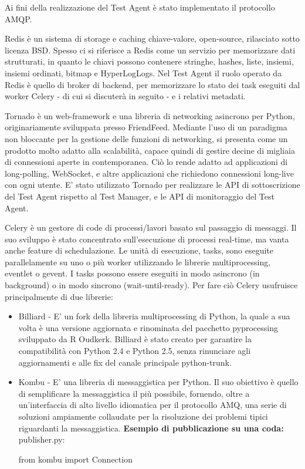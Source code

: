 \begin{description}[nolistsep]
Ai fini della realizzazione del Test Agent è stato implementato il protocollo AMQP.
\newline
\item[Redis]Redis è un sistema di storage e caching chiave-valore, open-source, rilasciato sotto licenza BSD. Spesso ci si riferisce a Redis come un servizio per memorizzare dati strutturati, in quanto le chiavi possono contenere stringhe, hashes, liste, insiemi, insiemi ordinati, bitmap e HyperLogLogs.\cite{RedisWebsite}\newline
Nel Test Agent il ruolo operato da Redis è quello di broker di backend, per memorizzare lo stato dei task eseguiti dal worker Celery - di cui si discuterà in seguito - e i relativi metadati.
\item[Tornado]
Tornado è un web-framework e una libreria di networking asincrono per Python, originariamente sviluppata presso FriendFeed.
Mediante l'uso di un paradigma non bloccante per la gestione delle funzioni di networking, si presenta come un prodotto molto adatto alla scalabilità, capace quindi di gestire decine di migliaia di connessioni aperte in contemporanea. Ciò lo rende adatto ad applicazioni di long-polling, WebSocket, e altre applicazioni che richiedono connessioni long-live con ogni utente.\cite{TornadoWebsite}\newline
E' stato utilizzato Tornado per realizzare le API di sottoscrizione del Test Agent rispetto al Test Manager, e le API di monitoraggio del Test Agent.
\item[Celery]
Celery è un gestore di code di processi/lavori basato sul passaggio di messaggi. Il suo sviluppo è stato concentrato sull'esecuzione di processi real-time, ma vanta anche feature di schedulazione.
Le unità di esecuzione, tasks, sono eseguite parallelamente su uno o più worker utilizzando le librerie multiprocessing, eventlet o gevent.
I tasks possono essere eseguiti in modo asincrono (in background) o in modo sincrono (wait-until-ready).
Per fare ciò Celery usufruisce principalmente di due librerie:
\begin{itemize}[nolistsep]
\item Billiard - E' un fork della libreria multiprocessing di Python, la quale a sua volta è una versione aggiornata e rinominata del pacchetto pyprocessing sviluppato da R Oudkerk.
Billiard è stato creato per garantire la compatibilità con Python 2.4 e Python 2.5, senza rinunciare agli aggiornamenti e alle fix del canale principale python-trunk.
\item Kombu - E' una libreria di messaggistica per Python. Il suo obiettivo è quello di semplificare la messaggistica il più possibile, fornendo, oltre a un'interfaccia di alto livello idiomatica per il protocollo AMQ, una serie di soluzioni ampiamente collaudate per la risoluzione dei problemi tipici riguardanti la messaggistica.
\newline\newline
\textbf{Esempio di pubblicazione su una coda:}
publisher.py:
\begin{python}
from kombu import Connection


\end{python}
\end{itemize}
\end{description}
